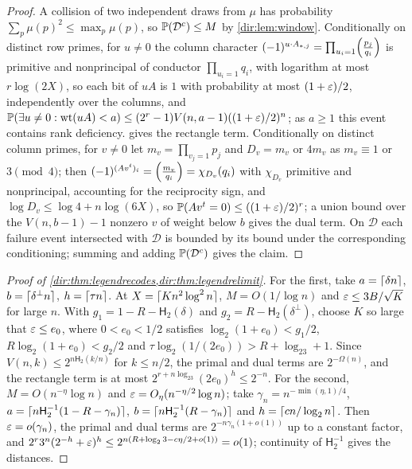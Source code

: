 \begin{proof}
A collision of two independent draws from $\mu$ has probability $\sum_p\mu(p)^2\le\max_p\mu(p)$, so
$\mathbb{P}(\mathcal D^c)\le M$ by \cref{dir:lem:window}. Conditionally on distinct row primes, for $u\ne0$ the column
character $(-1)^{u\cdot A_{*,j}}=\prod_{u_i=1}\Bigl(\frac{p_j}{q_i}\Bigr)$ is primitive and nonprincipal of conductor
$\prod_{u_i=1}q_i$, with logarithm at most $r\log(2X)$, so each bit of $uA$ is $1$ with probability at most
$(1+\varepsilon)/2$, independently over the columns, and
$\mathbb{P}(\exists u\ne0:\mathrm{wt}(uA)<a)\le(2^r-1)V(n,a-1)((1+\varepsilon)/2)^n$; as $a\ge1$ this event contains rank
deficiency.  gives the rectangle term. Conditionally on distinct column primes, for
$v\ne0$ let $m_v=\prod_{v_j=1}p_j$ and $D_v=m_v$ or $4m_v$ as $m_v\equiv1$ or $3\pmod4$; then
$(-1)^{(Av^t)_i}=\Bigl(\frac{m_v}{q_i}\Bigr)=\chi_{D_v}(q_i)$ with $\chi_{D_v}$ primitive and nonprincipal, accounting
for the reciprocity sign, and $\log D_v\le\log4+n\log(6X)$, so $\mathbb{P}(Av^t=0)\le((1+\varepsilon)/2)^r$; a union bound over
the $V(n,b-1)-1$ nonzero $v$ of weight below $b$ gives the dual term. On $\mathcal D$ each failure event intersected
with $\mathcal D$ is bounded by its bound under the corresponding conditioning; summing and adding
$\mathbb{P}(\mathcal D^c)$ gives the claim.
\end{proof}

\begin{proof}[Proof of \cref{dir:thm:legendrecodes,dir:thm:legendrelimit}]
For the first, take $a=\lceil\delta n\rceil$, $b=\lceil\delta^\perp n\rceil$, $h=\lceil\tau n\rceil$. At $X=\lceil Kn^2\log^2n\rceil$,
$M=O(1/\log n)$ and $\varepsilon\le3B/\sqrt K$ for large $n$. With $g_1=1-R-\mathsf H_2(\delta)$ and
$g_2=R-\mathsf H_2(\delta^\perp)$, choose $K$ so large that $\varepsilon\le e_0$, where $0<e_0<1/2$ satisfies
$\log_2(1+e_0)<g_1/2$, $R\log_2(1+e_0)<g_2/2$ and $\tau\log_2(1/(2e_0))>R+\log_23+1$. Since
$V(n,k)\le2^{n\mathsf H_2(k/n)}$ for $k\le n/2$, the primal and dual terms are $2^{-\Omega(n)}$, and the rectangle
term is at most $2^{r+n\log_23}(2e_0)^h\le2^{-n}$. For the second, $M=O(n^{-\eta}\log n)$ and
$\varepsilon=O_\eta(n^{-\eta/2}\log n)$; take $\gamma_n=n^{-\min(\eta,1)/4}$,
$a=\lceil n\mathsf H_2^{-1}(1-R-\gamma_n)\rceil$, $b=\lceil n\mathsf H_2^{-1}(R-\gamma_n)\rceil$ and
$h=\lceil cn/\log_2n\rceil$. Then $\varepsilon=o(\gamma_n)$, the primal and dual terms are $2^{-n\gamma_n(1+o(1))}$ up to a
constant factor, and $2^r3^n(2^{-h}+\varepsilon)^h\le2^{n(R+\log_23-c\eta/2+o(1))}=o(1)$; continuity of
$\mathsf H_2^{-1}$ gives the distances.
\end{proof}

